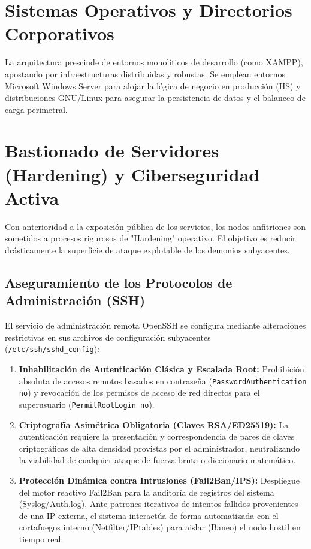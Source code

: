 \documentclass[12pt,a4paper]{article}
\begin{document}
\newpage
\section{Sistemas Operativos y Directorios Corporativos}
\label{SistemasOperativos}

La arquitectura prescinde de entornos monolíticos de desarrollo (como XAMPP), apostando por infraestructuras distribuidas y robustas. Se emplean entornos Microsoft Windows Server para alojar la lógica de negocio en producción (IIS) y distribuciones GNU/Linux para asegurar la persistencia de datos y el balanceo de carga perimetral.

\section{Bastionado de Servidores (Hardening) y Ciberseguridad Activa}
\label{Hardening}

Con anterioridad a la exposición pública de los servicios, los nodos anfitriones son sometidos a procesos rigurosos de "Hardening" operativo. El objetivo es reducir drásticamente la superficie de ataque explotable de los demonios subyacentes.

\subsection{Aseguramiento de los Protocolos de Administración (SSH)}
El servicio de administración remota OpenSSH se configura mediante alteraciones restrictivas en sus archivos de configuración subyacentes (\texttt{/etc/ssh/sshd\_config}):

\begin{enumerate}
    \item \textbf{Inhabilitación de Autenticación Clásica y Escalada Root:} Prohibición absoluta de accesos remotos basados en contraseña (\texttt{PasswordAuthentication no}) y revocación de los permisos de acceso de red directos para el superusuario (\texttt{PermitRootLogin no}).
    \item \textbf{Criptografía Asimétrica Obligatoria (Claves RSA/ED25519):} La autenticación requiere la presentación y correspondencia de pares de claves criptográficas de alta densidad provistas por el administrador, neutralizando la viabilidad de cualquier ataque de fuerza bruta o diccionario matemático.
    \item \textbf{Protección Dinámica contra Intrusiones (Fail2Ban/IPS):} Despliegue del motor reactivo Fail2Ban para la auditoría de registros del sistema (Syslog/Auth.log). Ante patrones iterativos de intentos fallidos provenientes de una IP externa, el sistema interactúa de forma automatizada con el cortafuegos interno (Netfilter/IPtables) para aislar (Baneo) el nodo hostil en tiempo real.
\end{enumerate}
\end{document}
